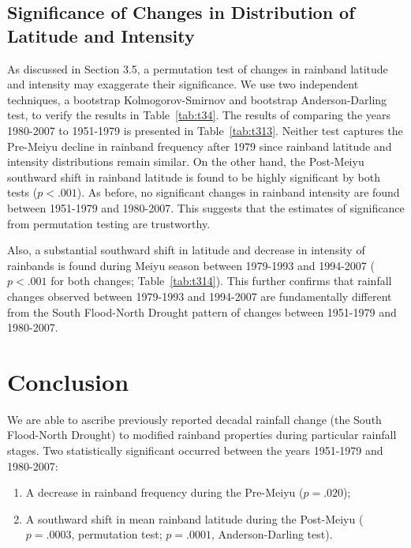 \documentclass{ametsoc}
\begin{document}
\subsection{Significance of Changes in Distribution of Latitude and Intensity}

	As discussed in Section 3.5, a permutation test of changes in rainband latitude and intensity may exaggerate their significance. We use two independent techniques, a bootstrap Kolmogorov-Smirnov and bootstrap Anderson-Darling test, to verify the results in Table~\ref{tab:t34}. The results of comparing the years 1980-2007 to 1951-1979 is presented in Table~\ref{tab:t313}. Neither test captures the Pre-Meiyu decline in rainband frequency after 1979 since rainband latitude and intensity distributions remain similar. On the other hand, the Post-Meiyu southward shift in rainband latitude is found to be highly significant by both tests ($p<.001$). As before, no significant changes in rainband intensity are found between 1951-1979 and 1980-2007. This suggests that the estimates of significance from permutation testing are trustworthy.

	Also, a substantial southward shift in latitude and decrease in intensity of rainbands is found during Meiyu season between 1979-1993 and 1994-2007 ($p<.001$ for both changes; Table~\ref{tab:t314}). This further confirms that rainfall changes observed between 1979-1993 and 1994-2007 are fundamentally different from the South Flood-North Drought pattern of changes between 1951-1979 and 1980-2007.

\section{Conclusion}
	
	We are able to ascribe previously reported decadal rainfall change (the South Flood-North Drought) to modified rainband properties during particular rainfall stages. Two statistically significant occurred between the years 1951-1979 and 1980-2007: 

\begin{enumerate} 
\item A decrease in rainband frequency during the Pre-Meiyu ($p=.020$);
\item A southward shift in mean rainband latitude during the Post-Meiyu ($p=.0003$, permutation test; $p=.0001$, Anderson-Darling test). 
\end{enumerate}
	
\end{document}
